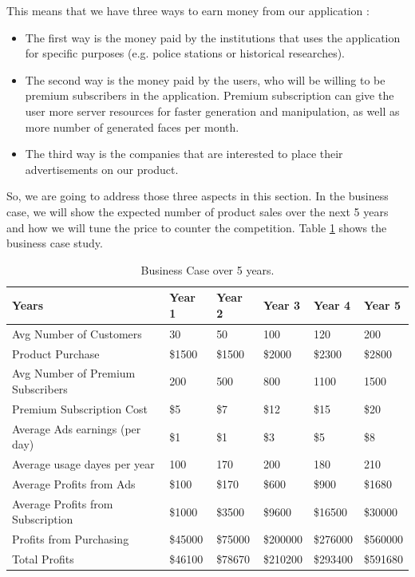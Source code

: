 This means that we have three ways to earn money from our application :
\begin{itemize}
    \item The first way is the money paid by the institutions that uses the application for specific purposes (e.g. police stations or historical researches).
    \item The second way is the money paid by the users, who will be willing to be premium subscribers in the application. Premium subscription can give the user more server resources for faster generation and manipulation, as well as more number of generated faces per month.
    \item The third way is the companies that are interested to place their advertisements on our product.
\end{itemize}

So, we are going to address those three aspects in this section. In the business case, we will show the expected number of product sales over the next 5 years and how we will tune the price to counter the competition. Table \ref{tab:business} shows the business case study.

\begin{table}[H]
\centering
\caption{Business Case over 5 years.}
\begin{tabular}[t]{| l | l | l | l | l | l |}
\hline
Years & Year 1 & Year 2 & Year 3 & Year 4 & Year 5 \\
\hline \hline
Avg Number of Customers & 30 & 50 & 100 & 120 & 200 \\
\hline
Product Purchase & \$1500 & \$1500 & \$2000 & \$2300 & \$2800 \\
\hline
Avg Number of Premium Subscribers & 200 & 500 & 800 & 1100 & 1500 \\
\hline
Premium Subscription Cost & \$5 & \$7 & \$12 & \$15 & \$20 \\
\hline
Average Ads earnings (per day) & \$1 & \$1 & \$3 & \$5 & \$8 \\
\hline
Average usage dayes per year & 100 & 170 & 200 & 180 & 210 \\
\hline
Average Profits from Ads & \$100 & \$170 & \$600 & \$900 & \$1680 \\
\hline
Average Profits from Subscription & \$1000 & \$3500 & \$9600 & \$16500 & \$30000 \\
\hline
Profits from Purchasing & \$45000 & \$75000 & \$200000 & \$276000 & \$560000 \\
\hline
Total Profits & \$46100 & \$78670 & \$210200 & \$293400 & \$591680 \\
\hline
\end{tabular}
\label{tab:business}
\end{table}

